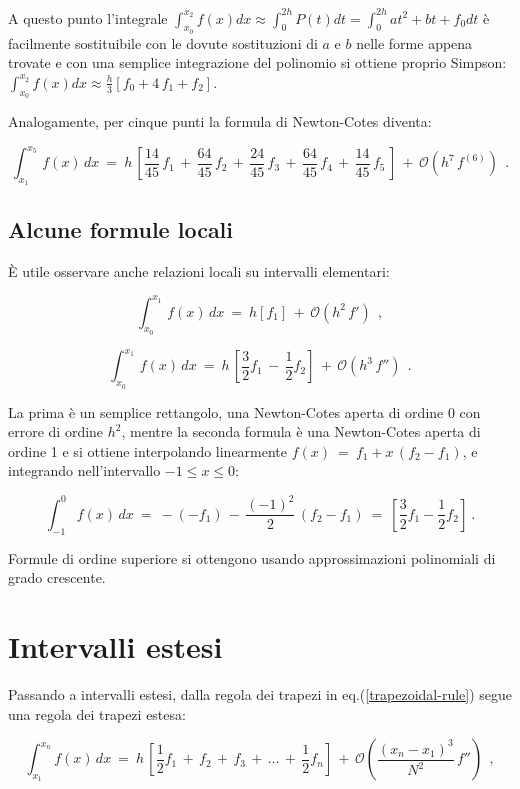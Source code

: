 A questo punto l'integrale $\int_{x_0}^{x_2} f(x) dx\approx \int_0^{2h} P(t) dt= \int_0^{2h} at^2+bt+f_0 dt$ è facilmente sostituibile con le dovute sostituzioni di $a$ e $b$ nelle forme appena trovate e con una semplice integrazione del polinomio si ottiene proprio Simpson: $\int_{x_0}^{x_2} f(x) dx\approx \frac{h}{3} [f_0 + 4\,f_1 + f_2]$.

Analogamente, per cinque punti la formula di Newton-Cotes diventa:

\[ \int_{x_1}^{x_5}\, f(x)\, dx\ =\ h\, \left[ \frac{14}{45}\, f_1\, +\, \frac{64}{45}\, f_2\, +\, \frac{24}{45}\, f_3\, +\, \frac{64}{45}\, f_4\, +\, \frac{14}{45}\, f_5\, \right]\, +\, \mathcal{O}(h^7\, f^{(6)})\ \ .\]

\subsection{Alcune formule locali}

È utile osservare anche relazioni locali su intervalli elementari:

\[ \int_{x_0}^{x_1}\, f(x)\, dx\ =\ h[f_1]\, +\, \mathcal{O}(h^2\, f')\ \ ,\]


\[ \int_{x_0}^{x_1}\, f(x)\, dx\ =\ h\, \left[ \frac{3}{2}f_1\, -\, \frac{1}{2}f_2 \right]\, +\, \mathcal{O}(h^3\, f'')\ \ .\]

La prima è un semplice rettangolo, una Newton-Cotes aperta di ordine 0 con errore di ordine $h^2$, mentre la seconda formula è una Newton-Cotes aperta di ordine 1 e si ottiene interpolando linearmente $f(x)\ =\ f_1 + x\, (f_2 - f_1)$, e integrando nell'intervallo $-1 \le x \le 0$:

\[ \int_{-1}^{0} f(x)\,dx\ =\ -(-f_1)\, -\, \frac{(-1)^2}{2}\, (f_2 - f_1) \ =\ \left[ \frac{3}{2}f_1 - \frac{1}{2}f_2\right]\ .\]

Formule di ordine superiore si ottengono usando approssimazioni polinomiali di grado crescente.

\section{Intervalli estesi}

Passando a intervalli estesi, dalla regola dei trapezi in eq.(\ref{trapezoidal-rule}) segue una regola dei trapezi estesa:

\begin{equation} \label{regola-dei-trapezi-estesa}
	\int_{x_1}^{x_n} f(x)\,dx\ =\ h\, \left[
	\frac{1}{2}f_1\, +\, f_2\, +\, f_3\, +\, \dots\, +\, \frac{1}{2}f_n
	\right]\, +\,
	\mathcal{O}\!\left(\frac{(x_n-x_1)^3}{N^2}\, f''\right)\ \ ,
\end{equation} 

